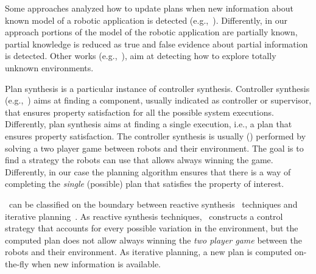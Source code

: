 \begin{enumerate*}
\item Some  approaches  analyzed how to update plans when new information about known model of a robotic application is detected (e.g.,~\cite{guo2015multi}). 
Differently, in our approach portions of the model of the robotic application are partially known,  partial knowledge is reduced as true and false evidence about partial information is detected.
Other works (e.g.,~\cite{7139310}), aim at detecting how to explore totally unknown environments.
\item 
Plan synthesis is a particular instance of controller synthesis. 
Controller  synthesis (e.g.,~\cite{cassandras2009introduction,D'ippolito:2013:SNE:2430536.2430543}) aims at finding a component, usually indicated as controller or supervisor, that ensures property satisfaction for all the possible system executions.
Differently, plan synthesis aims at finding a single execution, i.e., a plan that ensures property satisfaction.
The controller synthesis  is usually (\cite{kress2009temporal,wongpiromsarn2009receding,chen2012ltl,livingston2012backtracking,guo2013revising}) performed by solving a two player game between robots and their environment.
The goal is to find a strategy the robots can use that allows always winning the game.
Differently, in our case the planning algorithm ensures that there is a way of completing the \emph{single} (possible) plan that satisfies the property of interest. 
\item \toolName\ can be classified on the boundary between reactive synthesis~\cite{chen2012ltl,livingston2012backtracking,thomas2002automata} techniques and iterative planning~\cite{guo2013revising,maly2013iterative}. 
As reactive synthesis techniques, \toolName\ constructs a control strategy that accounts for every possible variation in the environment, but the computed plan does not allow always winning the  \emph{two player game} between the robots and their environment.
As  iterative planning, a new plan is computed on-the-fly when new information is available.
\end{enumerate*}
